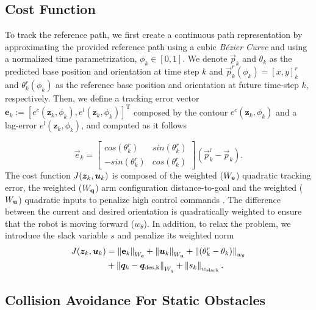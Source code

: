 \subsection{Cost Function}%
\label{sub:cost_function}
To track the reference path, we first create a continuous path representation by approximating the provided reference path using a cubic \textit{Bézier Curve} and using a normalized time parametrization, $\phi_k \in [0, 1]$. We denote $\vec{p}_k$ and $\theta_k$ as the predicted base position and orientation at time step $k$ and $\vec{p}^{r}_{k}(\phi_k) = [x,y]^{r}_{k}$ and $\theta_k^r(\phi_k)$ as the reference base position and orientation at future time-step $k$, respectively.
Then, we define a tracking error vector $\boldsymbol{e}_k := [e^c(\boldsymbol{z}_k,\phi_k),e^l(\boldsymbol{z}_k,\phi_k)]^\textrm{T}$ composed by the contour $e^c(\boldsymbol{z}_k,\phi_k)$ and a lag-error $e^l(\boldsymbol{z}_k,\phi_k)$, and computed as it follows

\begin{equation}
  \vec{e}_{k} =
      \begin{bmatrix}
        cos(\theta_k^r) & sin(\theta^r_k) \\
        -sin(\theta^r_k) & cos(\theta^r_k)
      \end{bmatrix} 
    \left(\vec{p}^{\textrm{r}}_{k} - \vec{p}_{k}\right).
\end{equation}
%
The cost function $J(\bm{z}_{k}, \bm{u}_{k})$ is composed of the weighted ($W_{\mathbf{e}}$) quadratic tracking error, the weighted ($W_{\mathbf{q}}$) arm configuration distance-to-goal and the weighted ($W_{\mathbf{u}}$) quadratic inputs to penalize high control commands . The difference between the current and desired orientation is quadratically weighted to ensure that the robot is moving forward ($w_{\theta}$).
 In addition, to relax the problem, we introduce the slack variable $s$ and penalize its weighted norm
\begin{equation}
  \begin{aligned}
  J(\bm{z}_{k}, \bm{u}_{k}) &
    = \left\lVert\mathbf{e}_{k}\right\rVert_{W_{\mathbf{e}}} +\left\lVert \bm{u}_k\right\rVert_{W_{\mathbf{u}}}  + \left\lVert\left(\theta^r_{k} - \theta_k\right)\right\rVert_{w_{\theta}} \\
    & + \left\lVert\bm{q}_k - \bm{q}_{\textrm{des,k}}\right\rVert_{W_q} 
    + \left\lVert s_k\right\rVert_{w_{\textrm{slack}}}.
  \end{aligned}
\end{equation}

\subsection{Collision Avoidance For Static Obstacles}%
\label{sub:collision_avoidance_static}

